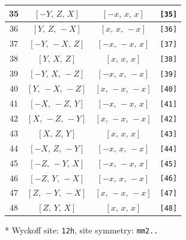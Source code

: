 \documentclass[fleqn,8pt]{jsarticle}
\begin{document}
\begin{longtable}{cccc}
35 & $\left[ - Y,\, Z,\, X \right]$ & $\left[ - x,\, x,\, x \right]$ & {\tt [35]} \\ \hline
36 & $\left[ Y,\, Z,\, - X \right]$ & $\left[ x,\, x,\, - x \right]$ & {\tt [36]} \\ \hline
37 & $\left[ - Y,\, - X,\, Z \right]$ & $\left[ - x,\, - x,\, x \right]$ & {\tt [37]} \\ \hline
38 & $\left[ Y,\, X,\, Z \right]$ & $\left[ x,\, x,\, x \right]$ & {\tt [38]} \\ \hline
39 & $\left[ - Y,\, X,\, - Z \right]$ & $\left[ - x,\, x,\, - x \right]$ & {\tt [39]} \\ \hline
40 & $\left[ Y,\, - X,\, - Z \right]$ & $\left[ x,\, - x,\, - x \right]$ & {\tt [40]} \\ \hline
41 & $\left[ - X,\, - Z,\, Y \right]$ & $\left[ - x,\, - x,\, x \right]$ & {\tt [41]} \\ \hline
42 & $\left[ X,\, - Z,\, - Y \right]$ & $\left[ x,\, - x,\, - x \right]$ & {\tt [42]} \\ \hline
43 & $\left[ X,\, Z,\, Y \right]$ & $\left[ x,\, x,\, x \right]$ & {\tt [43]} \\ \hline
44 & $\left[ - X,\, Z,\, - Y \right]$ & $\left[ - x,\, x,\, - x \right]$ & {\tt [44]} \\ \hline
45 & $\left[ - Z,\, - Y,\, X \right]$ & $\left[ - x,\, - x,\, x \right]$ & {\tt [45]} \\ \hline
46 & $\left[ - Z,\, Y,\, - X \right]$ & $\left[ - x,\, x,\, - x \right]$ & {\tt [46]} \\ \hline
47 & $\left[ Z,\, - Y,\, - X \right]$ & $\left[ x,\, - x,\, - x \right]$ & {\tt [47]} \\ \hline
48 & $\left[ Z,\, Y,\, X \right]$ & $\left[ x,\, x,\, x \right]$ & {\tt [48]} \\
\end{longtable}
* Wyckoff site: {\tt 12h}, site symmetry: {\tt mm2..}
\renewcommand{\arraystretch}{1.2}
\end{document}
